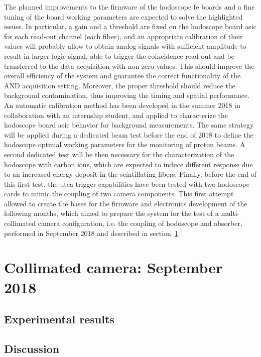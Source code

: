 The planned improvements to the firmware of the hodoscope \gls{fe} boards and a fine tuning of the board working parameters are expected to solve the highlighted issues. In particular, a gain and a threshold are fixed on the hodoscope board \gls{asic} for each read-out channel (each fiber), and an appropriate calibration of their values will probably allow to obtain analog signals with sufficient amplitude to result in larger logic signal, able to trigger the coincidence read-out and be transferred to the data acquisition with non-zero values. This should improve the overall efficiency of the system and guarantee the correct functionality of the AND acquisition setting. Moreover, the proper threshold should reduce the background contamination, thus improving the timing and spatial performance.  
An automatic calibration method has been developed in the summer 2018 in collaboration with an internship student, and applied to characterize the hodoscope board \gls{asic} behavior for background measurements. The same strategy will be applied during a dedicated beam test before the end of 2018 to define the hodoscope optimal working parameters for the monitoring of proton beams. A second dedicated test will be then necessary for the characterization of the hodoscope with carbon ions, which are expected to induce different response due to an increased energy deposit in the scintillating fibers.   
Finally, before the end of this first test, the \gls{utca} trigger capabilities have been tested with two hodoscope cards to mimic the coupling of two camera components. This first attempt allowed to create the bases for the firmware and electronics development of the following months, which aimed to prepare the system for the test of a multi-collimated camera configuration, i.e. the coupling of hodoscope and absorber, performed in September 2018 and described in section~\ref{chap6::sec::september2018}. 


\section{Collimated camera: September 2018}\label{chap6::sec::september2018}

\subsection{Experimental results}\label{chap6::subsec::mayResults} 

\subsection{Discussion}\label{chap6::subsec::mayDiscussion} 

\clearpage
